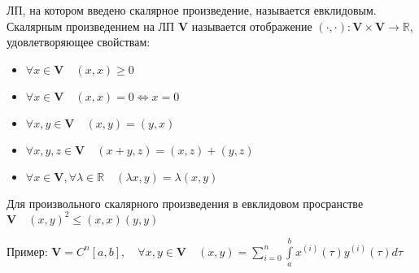 \documentclass[__main__.tex]{subfiles}
\begin{document}
\begin{definition}
	ЛП, на котором введено скалярное произведение, называется евклидовым. Скалярным произведением на ЛП $\mathbf{V}$ называется отображение $(\cdot,\cdot):\mathbf{V}\times\mathbf{V}\rightarrow\mathbb{R}$, удовлетворяющее свойствам:
	\begin{itemize}
		\item $\forall x\in\mathbf{V}\quad(x,x)\ge 0$
		\item $\forall x\in\mathbf{V}\quad(x,x)=0\Leftrightarrow x=0$
		\item $\forall x,y\in\mathbf{V}\quad(x,y)=(y,x)$
		\item $\forall x,y,z\in\mathbf{V}\quad(x+y,z)=(x,z)+(y,z)$
		\item $\forall x\in\mathbf{V},\forall\lambda\in\mathbb{R}\quad(\lambda x,y)=\lambda(x,y)$
	\end{itemize}
\end{definition}
\begin{theorem}[НКБ]
	Для произвольного скалярного произведения в евклидовом просранстве $\mathbf{V}\quad (x,y)^2\le(x,x)(y,y)$
\end{theorem}
Пример: $\mathbf{V}=C^n[a,b],\quad\forall x,y\in\mathbf{V}\quad(x,y)=\sum\limits_{i=0}^n\int\limits_a^b x^{(i)}(\tau)y^{(i)}(\tau)d\tau$
\end{document}
